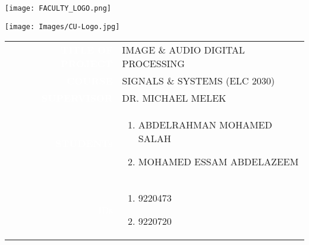 \documentclass[10pt,a4paper]{article}
\numberwithin{equation}{section}
\begin{document}
\pagestyle{empty}
\vspace{1.5cm}
\begin{center}
\texttt{[image: FACULTY\_LOGO.png]}
\end{center}
\vspace{0.8cm}
\begin{center}
\texttt{[image: Images/CU-Logo.jpg]}
\end{center}

\large

\vspace{2cm}

\begin{center}
{\setlength\arrayrulewidth{2pt}
\begin{tabular}{r|p{9.8cm}}
\arrayrulecolor{udc}
\colorbox{udc}{\textcolor{white}{\bf TITLE OF PROJECT}}      
&	IMAGE \& AUDIO DIGITAL PROCESSING         \\[2cm]
\colorbox{udc}{\textcolor{white}{\bf COURSE}}       & SIGNALS \& SYSTEMS (ELC 2030)   \\[1cm]
\colorbox{udc}{\textcolor{white}{\bf SUPERVISOR}}  &DR. MICHAEL MELEK    \\[1cm]
\colorbox{udc}{\textcolor{white}{\bf STUDENTs}}  &\begin{enumerate}
    \item ABDELRAHMAN MOHAMED SALAH
    \item MOHAMED ESSAM ABDELAZEEM
\end{enumerate}	 
\\[2cm]%
\colorbox{udc}{\textcolor{white}{IDs}}       	&\begin{enumerate}
    \item 9220473
    \item 9220720
\end{enumerate}	 
\end{tabular}}
\end{center}
\normalsize
\end{document}
